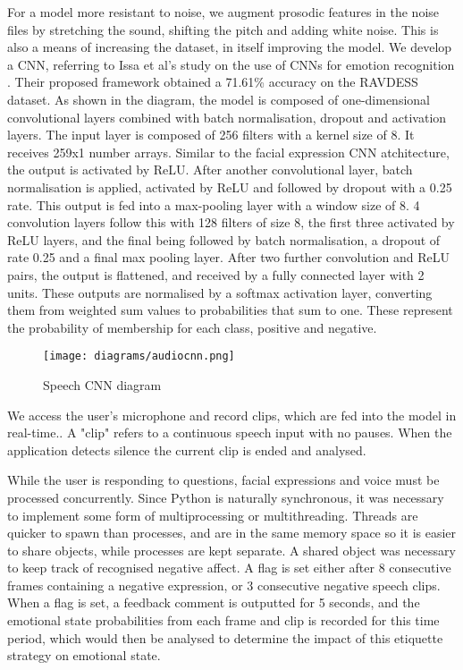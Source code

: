 \documentclass[12pt,a4paper]{article}
\begin{document}
For a model more resistant to noise, we augment prosodic features in the noise files by stretching the sound, shifting the pitch and adding white noise. This is also a means of increasing the dataset, in itself improving the model. We develop a CNN, referring to Issa et al's study on the use of CNNs for emotion recognition \cite{ISSA2020101894}. Their proposed framework obtained a 71.61\% accuracy on the RAVDESS dataset. As shown in the diagram, the model is composed of one-dimensional convolutional layers combined with batch normalisation, dropout and activation layers. The input layer is composed of 256 filters with a kernel size of 8. It receives 259x1 number arrays. Similar to the facial expression CNN atchitecture, the output is activated by ReLU. After another convolutional layer, batch normalisation is applied, activated by ReLU and followed by dropout with a 0.25 rate. This output is fed into a max-pooling layer with a window size of 8. 4 convolution layers follow this with 128 filters of size 8, the first three activated by ReLU layers, and the final being followed by batch normalisation, a dropout of rate 0.25 and a final max pooling layer. After two further convolution and ReLU pairs, the output is flattened, and received by a fully connected layer with 2 units. These outputs are normalised by a softmax activation layer, converting them from weighted sum values to probabilities that sum to one. These represent the probability of membership for each class, positive and negative.

\begin{figure}[h]
	\centerline{\texttt{[image: diagrams/audiocnn.png]}}
	\caption{Speech CNN diagram}
\end{figure}

We access the user's microphone and record clips, which are fed into the model in real-time.. A "clip" refers to a continuous speech input with no pauses. When the application detects silence the current clip is ended and analysed. 

While the user is responding to questions, facial expressions and voice must be processed concurrently. Since Python is naturally synchronous, it was necessary to implement some form of multiprocessing or multithreading. Threads are quicker to spawn than processes, and are in the same memory space so it is easier to share objects, while processes are kept separate. A shared object was necessary to keep track of recognised negative affect. A flag is set either after 8 consecutive frames containing a negative expression, or 3 consecutive negative speech clips. When a flag is set, a feedback comment is outputted for 5 seconds, and the emotional state probabilities from each frame and clip is recorded for this time period, which would then be analysed to determine the impact of this etiquette strategy on emotional state.
\end{document}
